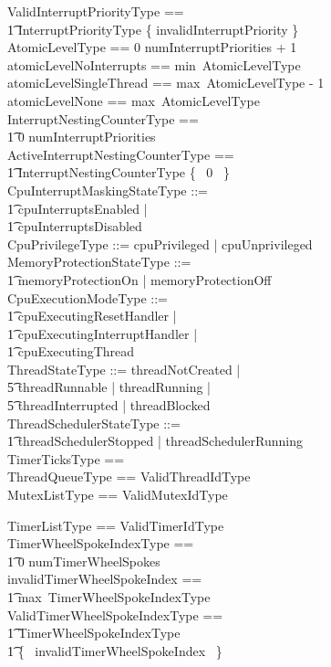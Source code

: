 \documentclass{AUJarticle}
\begin{document}
\begin{zed}
    ValidInterruptPriorityType == \\
    \t1 InterruptPriorityType \setminus \{ invalidInterruptPriority \} \\
    AtomicLevelType == 0 \upto numInterruptPriorities + 1 \\
    atomicLevelNoInterrupts == min~AtomicLevelType \\
    atomicLevelSingleThread == max~AtomicLevelType - 1 \\
    atomicLevelNone == max~AtomicLevelType \\
    InterruptNestingCounterType == \\
    \t1 0 \upto numInterruptPriorities \\
    ActiveInterruptNestingCounterType == \\
    \t1 InterruptNestingCounterType \setminus \{~ 0 ~\} \\
    CpuInterruptMaskingStateType ::= \\
    \t1 cpuInterruptsEnabled | \\
    \t1 cpuInterruptsDisabled \\
    CpuPrivilegeType ::= cpuPrivileged | cpuUnprivileged \\
    MemoryProtectionStateType ::= \\
    \t1 memoryProtectionOn | memoryProtectionOff \\
    CpuExecutionModeType ::= \\
    \t1 cpuExecutingResetHandler | \\
    \t1 cpuExecutingInterruptHandler | \\
    \t1 cpuExecutingThread \\
    ThreadStateType ::= threadNotCreated | \\
    \t5 threadRunnable | threadRunning | \\
    \t5 threadInterrupted | threadBlocked \\
    ThreadSchedulerStateType ::= \\
    \t1 threadSchedulerStopped | threadSchedulerRunning \\
    TimerTicksType == \nat \\
    ThreadQueueType == \iseq ValidThreadIdType \\
    MutexListType == \iseq ValidMutexIdType \\
\end{zed}

\begin{zed}
    TimerListType == \iseq ValidTimerIdType \\
    TimerWheelSpokeIndexType == \\
    \t1 0 \upto numTimerWheelSpokes \\
    invalidTimerWheelSpokeIndex == \\
    \t1 max~TimerWheelSpokeIndexType \\
    ValidTimerWheelSpokeIndexType == \\
    \t1 TimerWheelSpokeIndexType ~\setminus \\
    \t1 \{~ invalidTimerWheelSpokeIndex ~\} \\
\end{zed}
\end{document}
